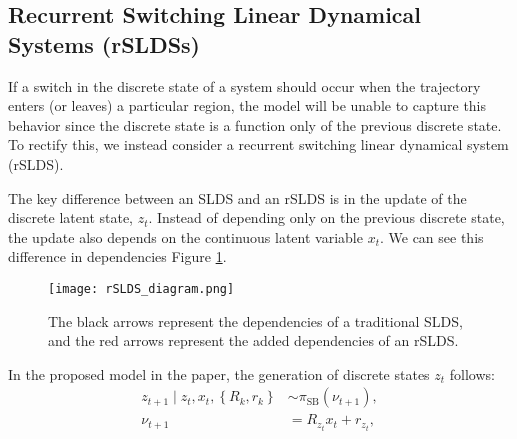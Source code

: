 
\subsection{Recurrent Switching Linear Dynamical Systems (rSLDSs)}

If a switch in the discrete state of a system should occur when the trajectory enters (or leaves) a particular region, the model will be unable to capture this behavior since the discrete state is a function only of the previous discrete state. To rectify this, we instead consider a recurrent switching linear dynamical system (rSLDS). 

The key difference between an SLDS and an rSLDS is in the update of the discrete latent state, $z_t$. Instead of depending only on the previous discrete state, the update also depends on the continuous latent variable $x_t$. We can see this difference in dependencies Figure \ref{rSLDS}.

\begin{figure}[h!]
	\centering
	\texttt{[image: rSLDS\_diagram.png]}
	\caption{The black arrows represent the dependencies of a traditional SLDS, and the red arrows represent the added dependencies of an rSLDS.}
	\label{rSLDS}
\end{figure}


In the proposed model in the paper, the generation of discrete states $z_{t}$ follows:
$$
\begin{aligned}
z_{t+1} \mid z_{t}, x_{t},\left\{R_{k}, r_{k}\right\} & \sim \pi_{\mathrm{SB}}\left(\nu_{t+1}\right), \\
\nu_{t+1} & =R_{z_{t}} x_{t}+r_{z_{t}},
\end{aligned}
$$

